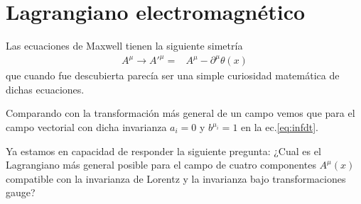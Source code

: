 



\section{Lagrangiano electromagnético}
Las ecuaciones de Maxwell tienen la siguiente simetría
\begin{align}
   A^\mu\to {A'}^\mu=&A^\mu-\partial^\mu\theta(x)
\end{align}
 que cuando fue descubierta parecía ser una simple curiosidad matemática de dichas ecuaciones.

Comparando con la transformación más general de un campo vemos que para el campo vectorial con dicha invarianza $a_i=0$ y $b^{\mu_i}=1$ en la ec.\eqref{eq:infdt}. 

Ya estamos en capacidad de responder la siguiente pregunta: ¿Cual es el Lagrangiano más general posible para el campo de cuatro componentes $A^{\mu}(x)$ compatible con la invarianza de Lorentz y la invarianza bajo transformaciones gauge?


